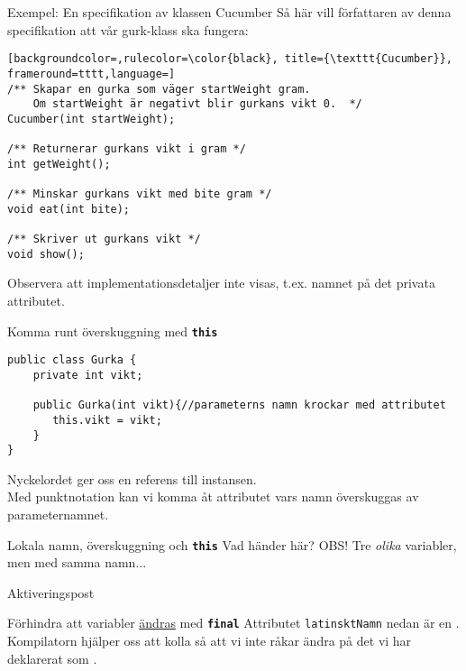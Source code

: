 \documentclass{lecturenotes}
\begin{document}
\begin{Slide}{Exempel: En specifikation av klassen Cucumber}
Så här vill författaren av denna specifikation att vår gurk-klass ska fungera:
\begin{lstlisting}[backgroundcolor=,rulecolor=\color{black}, title={\texttt{Cucumber}}, frameround=tttt,language=]
/** Skapar en gurka som väger startWeight gram. 
    Om startWeight är negativt blir gurkans vikt 0.  */
Cucumber(int startWeight);

/** Returnerar gurkans vikt i gram */
int getWeight();

/** Minskar gurkans vikt med bite gram */
void eat(int bite);

/** Skriver ut gurkans vikt */
void show();
\end{lstlisting}
Observera att implementationsdetaljer inte visas, t.ex. namnet på det privata attributet.
\end{Slide}

\begin{Slide}{Komma runt överskuggning med \texttt{\textbf{this}}}
\begin{lstlisting}[]
public class Gurka {
    private int vikt;  

    public Gurka(int vikt){//parameterns namn krockar med attributet
       this.vikt = vikt;
    } 
}
\end{lstlisting}
Nyckelordet  ger oss en referens till instansen. \\
Med punktnotation kan vi komma åt attributet vars namn överskuggas av parameternamnet.
\end{Slide}

\begin{Slide}{Lokala namn, överskuggning och \texttt{\textbf{this}}}
\scriptsize Vad händer här? OBS! Tre \textit{olika} variabler, men med samma namn...

\end{Slide}

\begin{Slide}{Aktiveringspost}
\end{Slide}

\begin{Slide}{Förhindra att variabler \href{https://docs.oracle.com/javase/tutorial/essential/concurrency/immutable.html}{ändras} med \texttt{\textbf{final}}}
Attributet \texttt{latinsktNamn} nedan är en .\\ Kompilatorn hjälper oss att kolla så att vi inte råkar ändra på det vi har deklarerat som .

\end{Slide}
\end{document}
